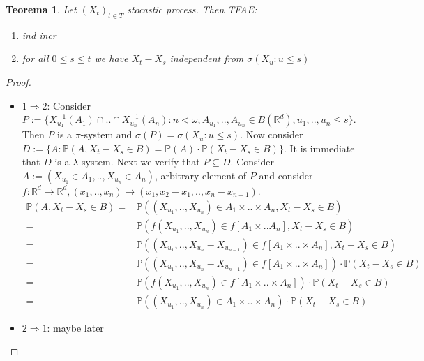 \documentclass[11pt,a4paper]{article}
\newtheorem{theorem}{Teorema}
\theoremstyle{definition}
\theoremstyle{remark}
\begin{document}
\begin{theorem}

	Let $(X_t)_{t \in T}$ stocastic process. Then TFAE:
	\begin{enumerate}
		\item	ind incr
		\item	for all $0 \leq s \leq t$ we have $X_t - X_s$ independent from $\sigma(X_u : u \leq s)$
	\end{enumerate}

\end{theorem}


\begin{proof}

	\begin{itemize}
		\item $1 \Rightarrow 2$: 
			Consider $P := \{X_{u_1}^{-1}(A_1) \cap .. \cap X_{u_n}^{-1}(A_n) : 
			n < \omega, A_{u_1},..,A_{u_n} \in B(\mathbb{R}^d), u_1,..,u_n \leq s\}$.
			Then $P$ is a $\pi$-system and $\sigma(P) = \sigma(X_u : u \leq s)$.
			Now consider $D := \{A : \mathbb{P}(A, X_t - X_s \in B) = \mathbb{P}(A) \cdot \mathbb{P}(X_t - X_s \in B)\}$.
			It is immediate that $D$ is a $\lambda$-system.
			Next we verify that $P \subseteq D$.
			Consider $A:=(X_{u_1} \in A_1,..,X_{u_{n}} \in A_n)$, arbitrary element of $P$ and consider
			$f: \mathbb{R}^d \to \mathbb{R}^d, (x_1,..,x_n) \mapsto (x_1,x_2 - x_1,..,x_{n} - x_{n-1})$.
			\begin{align*} 
				\mathbb{P}(A, X_t - X_s \in B) =& \mathbb{P}((X_{u_1},..,X_{u_n}) \in A_1 \times .. \times A_n, X_t - X_s \in B) \\
					=& \mathbb{P}(f(X_{u_1},..,X_{u_n}) \in f[A_1 \times .. A_n], X_t - X_s \in B) \\
				=& \mathbb{P}((X_{u_1},..,X_{u_n} - X_{u_{n-1}}) \in f[A_1 \times .. \times A_n], X_t - X_s \in B) \\
				=& \mathbb{P}((X_{u_1},..,X_{u_n} - X_{u_{n-1}}) \in f[A_1 \times .. \times A_n]) \cdot \mathbb{P}(X_t - X_s \in B) \\
				=& \mathbb{P}(f(X_{u_1},..,X_{u_n}) \in f[A_1 \times .. \times A_n]) \cdot \mathbb{P}(X_t - X_s \in B) \\
				=& \mathbb{P}((X_{u_1},..,X_{u_n}) \in A_1 \times .. \times A_n) \cdot \mathbb{P}(X_t - X_s \in B)
			\end{align*}
		
		\item $2 \Rightarrow 1$: maybe later
	\end{itemize}

\end{proof}
\end{document}
